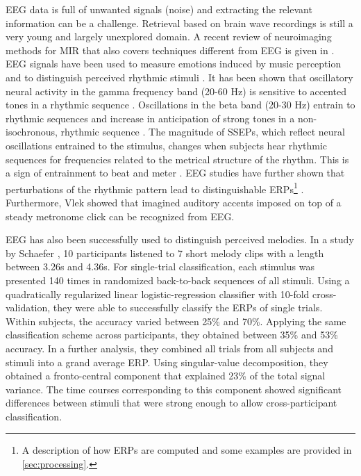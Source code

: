 EEG data is full of unwanted signals (noise) and extracting the relevant information can be a challenge.
Retrieval based on brain wave recordings is still a very young and largely unexplored domain.
A recent review of neuroimaging methods for \ac{MIR} that also covers techniques different from EEG is given in \cite{ismir2015kaneshiro}.
\ac{EEG} signals have been used to measure emotions induced by music perception \cite{lin_eeg_2009,cabredo_emotion_2012} and to distinguish perceived rhythmic stimuli \cite{stober2014nips}.
It has been shown that oscillatory neural activity in the gamma frequency band (20-60 Hz) is sensitive to accented tones in a rhythmic sequence \cite{snyder_gamma-band_2005}.
Oscillations in the beta band (20-30 Hz) entrain to rhythmic sequences \cite{cirelli_beta_2014, merchant_beta_2015} and increase in anticipation of strong tones in a non-isochronous, rhythmic sequence \cite{iversen_top-down_2009,fujioka_beta_2009,fujioka_internalized_2012}.
The magnitude of \acp{SSEP}, which reflect neural oscillations entrained to the stimulus, changes when subjects hear rhythmic sequences for frequencies related to the metrical structure of the rhythm.
This is a sign of entrainment to beat and meter \cite{nozaradan_tagging_2011,nozaradan_selective_2012}. 
\ac{EEG} studies have further shown that perturbations of the rhythmic pattern lead to distinguishable \acp{ERP}\footnote{A description of how \acfp{ERP} are computed and some examples are provided in \autoref{sec:processing}.} \cite{geiser_early_2009}.
Furthermore, Vlek \etal \cite{vlek_shared_2011} showed that imagined auditory accents imposed on top of a steady metronome click can be recognized from EEG.

EEG has also been successfully used to distinguish perceived melodies. 
In a study by Schaefer \etal \cite{schaefer_name_2011}, 10 participants listened to 7 short melody clips with a length between 3.26s and 4.36s.
For single-trial classification, each stimulus was presented 140 times in randomized back-to-back sequences of all stimuli.
Using a quadratically regularized linear logistic-regression classifier with 10-fold cross-validation, they were able to successfully classify the \acp{ERP} of single trials.
Within subjects, the accuracy varied between 25\% and 70\%.
Applying the same classification scheme across participants, they obtained between 35\% and 53\% accuracy.
In a further analysis, they combined all trials from all subjects and stimuli into a grand average \ac{ERP}.
Using singular-value decomposition, they obtained a fronto-central component that explained 23\% of the total signal variance.
The time courses corresponding to this component showed significant differences between stimuli that were strong enough to allow cross-participant classification.

